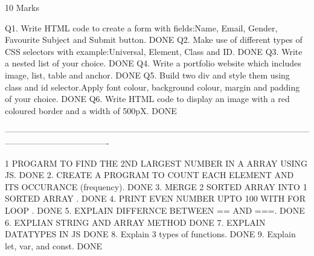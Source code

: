 10 Marks

Q1. Write HTML code to create a form with fields:Name, Email, Gender, Favourite Subject and Submit button.                             DONE
Q2. Make use of different types of CSS selectors with example:Universal, Element, Class and ID.                                        DONE
Q3. Write a nested list of your choice.                                                                                                DONE
Q4. Write a portfolio website which includes image, list, table and anchor.                                                            DONE
Q5. Build two div and style them using class and id selector.Apply font colour, background colour, margin and padding of your choice.  DONE
Q6. Write HTML code to display an image with a red coloured border and a width of 500pX.                                               DONE

-------------------------------------------------------------------------------------------------------------------------------------------------


1     PROGARM TO FIND THE 2ND LARGEST NUMBER IN A ARRAY USING JS.                                            DONE
2.    CREATE A PROGRAM TO COUNT EACH ELEMENT AND ITS OCCURANCE (frequency).                                  DONE
3.	  MERGE 2 SORTED ARRAY INTO 1 SORTED ARRAY .                                                             DONE
4.    PRINT EVEN NUMBER UPTO 100 WITH FOR LOOP .                                                             DONE
5.    EXPLAIN DIFFERNCE BETWEEN == AND ===.                                                                  DONE
6.	  EXPLIAN STRING AND ARRAY METHOD                                                                        DONE
7.	  EXPLAIN DATATYPES IN JS                                                                                DONE
8.    Explain 3 types of functions.                                                                          DONE
9.    Explain let, var, and const.                                                                           DONE
